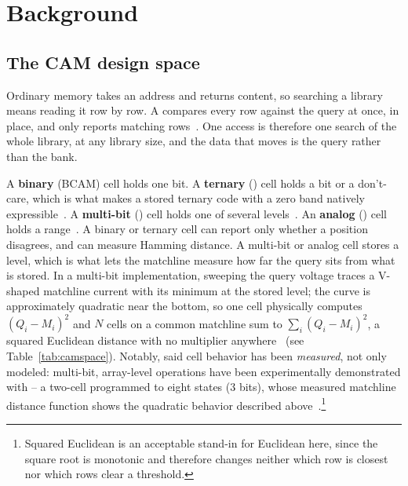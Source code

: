 \section{Background}
\label{sec:Background}

\subsection{The CAM design space}
\label{subsec:CAMspace}
Ordinary memory takes an address and returns content, so searching a
library means reading it row by row. A \cam compares every row
against the query at once, in place, and only reports matching
rows~\cite{pagiamtzis2006cam}. One access is therefore one search of
the whole library, at any library size, and the data that moves is the
query rather than the bank.

A \textbf{binary \cam} (BCAM) cell holds one bit. A
\textbf{ternary \cam} (\tcam) cell holds a bit or a don't-care, which
is what makes a stored ternary code with a zero band natively
expressible~\cite{ni2019fetcam}. A \textbf{multi-bit \cam} (\mcam) cell
holds one of several levels~\cite{kazemi2021fefetcam}. An
\textbf{analog \cam} (\acam) cell
holds a range~\cite{li2020acam}. A binary or ternary cell can report
only whether a position disagrees, and can measure Hamming
distance. A multi-bit or analog cell stores a level,
which is what lets the matchline measure how far the query sits from
what is stored. In a multi-bit \fefet implementation, sweeping the query
voltage traces a V-shaped matchline current with its minimum at the
stored level; the curve is approximately quadratic near the bottom, so
one cell physically computes $(Q_i-M_i)^2$ and $N$ cells on a common
matchline sum to $\sum_i (Q_i-M_i)^2$, a squared Euclidean distance with
no multiplier anywhere~\cite{kazemi2021fefetcam} (see Table~\ref{tab:camspace}). Notably, said cell
behavior has been \emph{measured}, not only modeled: multi-bit,
array-level \cam operations have been experimentally demonstrated
with \fefets -- a two-\fefet cell programmed to eight states (3
bits), whose measured matchline distance function shows the
quadratic behavior described above~\cite{kazemi2022hdcfefet}.\footnote{Squared
Euclidean is an acceptable stand-in for Euclidean here, since the square
root is monotonic and therefore changes neither which row is closest nor
which rows clear a threshold.}

